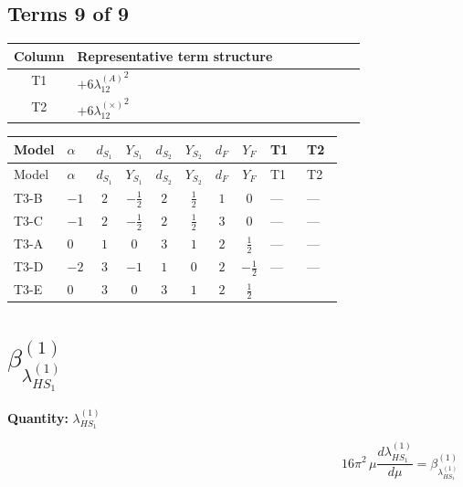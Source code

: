\documentclass[8pt]{article}
\begin{document}
\begin{landscape}
\subsection*{Terms 9 of 9}
\begin{center}
\begin{tabular}{@{}c >{\raggedright\arraybackslash}p{0.82\linewidth}@{}}
\toprule
Column & Representative term structure \\
\midrule
T1 & \(\displaystyle +6 {\lambda_{12}^{(A)}}^2\) \\
\midrule
T2 & \(\displaystyle +6 {\lambda_{12}^{(\times)}}^2\) \\
\midrule
\bottomrule
\end{tabular}
\end{center}
\smallskip
\tiny
\begin{longtable}{@{}llcccccc >{\raggedright\arraybackslash}p{0.21\linewidth} >{\raggedright\arraybackslash}p{0.21\linewidth}@{}}
\toprule
Model & $\alpha$ & $d_{S_1}$ & $Y_{S_1}$ & $d_{S_2}$ & $Y_{S_2}$ & $d_F$ & $Y_F$ & T1 & T2 \\
\midrule
\endfirsthead
\toprule
Model & $\alpha$ & $d_{S_1}$ & $Y_{S_1}$ & $d_{S_2}$ & $Y_{S_2}$ & $d_F$ & $Y_F$ & T1 & T2 \\
\midrule
\endhead
T3-B & $-1$ & $2$ & $-\frac{1}{2}$ & $2$ & $\frac{1}{2}$ & $1$ & $0$ & --- & --- \\
\midrule
T3-C & $-1$ & $2$ & $-\frac{1}{2}$ & $2$ & $\frac{1}{2}$ & $3$ & $0$ & --- & --- \\
\midrule
T3-A & $0$ & $1$ & $0$ & $3$ & $1$ & $2$ & $\frac{1}{2}$ & --- & --- \\
\midrule
T3-D & $-2$ & $3$ & $-1$ & $1$ & $0$ & $2$ & $-\frac{1}{2}$ & --- & --- \\
\midrule
T3-E & $0$ & $3$ & $0$ & $3$ & $1$ & $2$ & $\frac{1}{2}$ & \scriptsize\adjustbox{max width=\linewidth}{$\begin{gathered} +6 {\lambda_{12}^{(A)}}^2\end{gathered}$} & \scriptsize\adjustbox{max width=\linewidth}{$\begin{gathered} +6 {\lambda_{12}^{(\times)}}^2\end{gathered}$} \\
\midrule
\bottomrule
\end{longtable}
\clearpage
\section*{$\beta_{\lambda_{HS_1}^{(1)}}^{(1)}$}
\noindent\textbf{Quantity: }$\lambda_{HS_1}^{(1)}$\par\smallskip
\[16\pi^2\,\mu\frac{d \lambda_{HS_1}^{(1)}}{d\mu}=\beta_{\lambda_{HS_1}^{(1)}}^{(1)}\]

\end{landscape}
\end{document}
